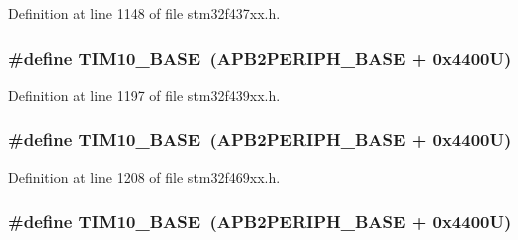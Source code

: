 Definition at line 1148 of file stm32f437xx.\+h.

\subsubsection[{\texorpdfstring{T\+I\+M10\+\_\+\+B\+A\+SE}{TIM10_BASE}}]{\setlength{\rightskip}{0pt plus 5cm}\#define T\+I\+M10\+\_\+\+B\+A\+SE~({\bf A\+P\+B2\+P\+E\+R\+I\+P\+H\+\_\+\+B\+A\+SE} + 0x4400\+U)}\hypertarget{group___peripheral__memory__map_ga3eff32f3801db31fb4b61d5618cad54a}{}\label{group___peripheral__memory__map_ga3eff32f3801db31fb4b61d5618cad54a}


Definition at line 1197 of file stm32f439xx.\+h.

\subsubsection[{\texorpdfstring{T\+I\+M10\+\_\+\+B\+A\+SE}{TIM10_BASE}}]{\setlength{\rightskip}{0pt plus 5cm}\#define T\+I\+M10\+\_\+\+B\+A\+SE~({\bf A\+P\+B2\+P\+E\+R\+I\+P\+H\+\_\+\+B\+A\+SE} + 0x4400\+U)}\hypertarget{group___peripheral__memory__map_ga3eff32f3801db31fb4b61d5618cad54a}{}\label{group___peripheral__memory__map_ga3eff32f3801db31fb4b61d5618cad54a}


Definition at line 1208 of file stm32f469xx.\+h.

\subsubsection[{\texorpdfstring{T\+I\+M10\+\_\+\+B\+A\+SE}{TIM10_BASE}}]{\setlength{\rightskip}{0pt plus 5cm}\#define T\+I\+M10\+\_\+\+B\+A\+SE~({\bf A\+P\+B2\+P\+E\+R\+I\+P\+H\+\_\+\+B\+A\+SE} + 0x4400\+U)}\hypertarget{group___peripheral__memory__map_ga3eff32f3801db31fb4b61d5618cad54a}{}\label{group___peripheral__memory__map_ga3eff32f3801db31fb4b61d5618cad54a}


